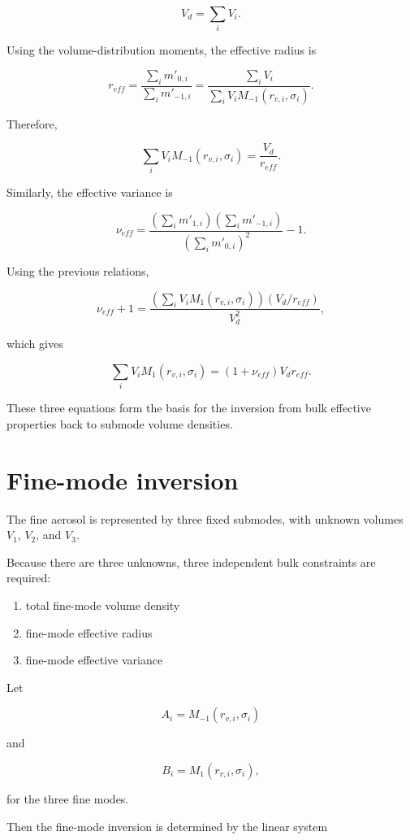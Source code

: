 \documentclass[
  letterpaper,
]{scrbook}
\providecommand{\tightlist}{%
  \setlength{\itemsep}{0pt}\setlength{\parskip}{0pt}}
\begin{document}
\[
V_d = \sum_i V_i.
\]

Using the volume-distribution moments, the effective radius is

\[
r_{eff}=\frac{\sum_i m'_{0,i}}{\sum_i m'_{-1,i}}
       =\frac{\sum_i V_i}{\sum_i V_i M_{-1}(r_{v,i},\sigma_i)}.
\]

Therefore,

\[
\sum_i V_i M_{-1}(r_{v,i},\sigma_i)=\frac{V_d}{r_{eff}}.
\]

Similarly, the effective variance is

\[
\nu_{eff}=\frac{\left(\sum_i m'_{1,i}\right)\left(\sum_i m'_{-1,i}\right)}
{\left(\sum_i m'_{0,i}\right)^2}-1.
\]

Using the previous relations,

\[
\nu_{eff}+1
=\frac{\left(\sum_i V_i M_1(r_{v,i},\sigma_i)\right)\left(V_d/r_{eff}\right)}{V_d^2},
\]

which gives

\[
\sum_i V_i M_1(r_{v,i},\sigma_i)
=(1+\nu_{eff})V_d r_{eff}.
\]

These three equations form the basis for the inversion from bulk
effective properties back to submode volume densities.

\section{Fine-mode inversion}\label{fine-mode-inversion}

The fine aerosol is represented by three fixed submodes, with unknown
volumes \(V_1\), \(V_2\), and \(V_3\).

Because there are three unknowns, three independent bulk constraints are
required:

\begin{enumerate}
\def\labelenumi{\arabic{enumi}.}
\tightlist
\item
  total fine-mode volume density
\item
  fine-mode effective radius
\item
  fine-mode effective variance
\end{enumerate}

Let

\[
A_i = M_{-1}(r_{v,i},\sigma_i)
\]

and

\[
B_i = M_{1}(r_{v,i},\sigma_i),
\]

for the three fine modes.

Then the fine-mode inversion is determined by the linear system
\end{document}
